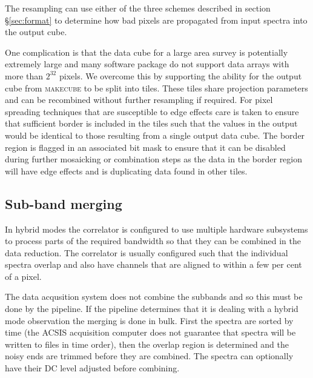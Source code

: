 \documentclass[final,authoryear,5p,times,twocolumn]{elsarticle}
\begin{document}
The resampling can use either of the three schemes described in
section \S\ref{sec:format} to determine how bad pixels are propagated
from input spectra into the output cube.

One complication is that the data cube for a large area survey is
potentially extremely large and many software package do not support
data arrays with more than $2^{32}$ pixels. We overcome this by
supporting the ability for the output cube from \textsc{makecube} to
be split into tiles. These tiles share projection parameters and can
be recombined without further resampling if required. For pixel
spreading techniques that are susceptible to edge effects care is
taken to ensure that sufficient border is included in the tiles such
that the values in the output would be identical to those resulting
from a single output data cube. The border region is flagged in an
associated bit mask to ensure that it can be disabled during further
mosaicking or combination steps as the data in the border region will
have edge effects and is duplicating data found in other tiles.

\subsection{Sub-band merging}

In hybrid modes the correlator is configured to use multiple
hardware subsystems to process parts of the required bandwidth so
that they can be combined in the data reduction. The correlator is
usually configured such that the individual spectra overlap and also
have channels that are aligned to within a few per cent of a pixel.

The data acqusition system does not combine the subbands and so this
must be done by the pipeline. If the pipeline determines that it is
dealing with a hybrid mode observation the merging is done in
bulk. First the spectra are sorted by time (the ACSIS acquisition
computer does not guarantee that spectra will be written to files in
time order), then the overlap region is determined and the noisy ends
are trimmed before they are combined. The spectra can optionally have
their DC level adjusted before combining.
\end{document}
